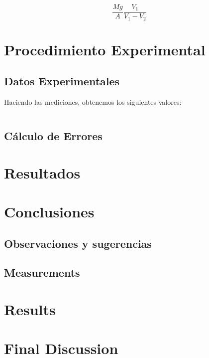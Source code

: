 \documentclass[a4paper,12pt]{article}
\begin{document}
\begin{equation}
  \frac{Mg}{A} \frac{V_1}{V_1-V_2}
\end{equation}

\section{Procedimiento Experimental}

\subsection{Datos Experimentales}
Haciendo las mediciones, obtenemos los siguientes valores:

$$$$

\subsection{Cálculo de Errores}

\section{Resultados}

\section{Conclusiones}

\subsection{Observaciones y sugerencias}

\subsection{Measurements}

\section{Results}

\section{Final Discussion}

\printbibliography
\end{document}
